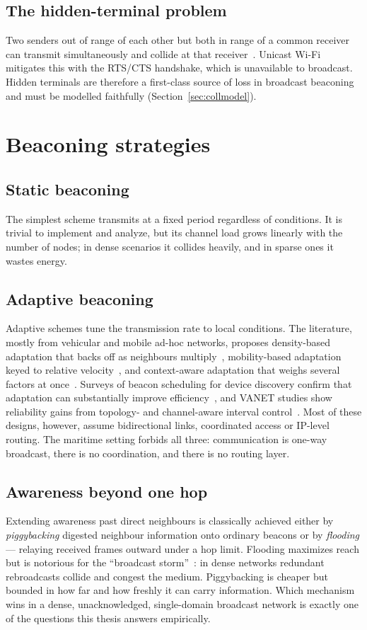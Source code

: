 \documentclass[12pt,a4paper,oneside]{report}
\begin{document}
\subsection{The hidden-terminal problem}
Two senders out of range of each other but both in range of a common receiver
can transmit simultaneously and collide at that receiver~\cite{tobagi-hidden}.
Unicast Wi-Fi mitigates this with the RTS/CTS handshake, which is unavailable to
broadcast. Hidden terminals are therefore a first-class source of loss in
broadcast beaconing and must be modelled faithfully (Section~\ref{sec:collmodel}).

\section{Beaconing strategies}
\subsection{Static beaconing}
The simplest scheme transmits at a fixed period regardless of conditions. It is
trivial to implement and analyze, but its channel load grows linearly with the
number of nodes; in dense scenarios it collides heavily, and in sparse ones it
wastes energy.

\subsection{Adaptive beaconing}
Adaptive schemes tune the transmission rate to local conditions. The literature,
mostly from vehicular and mobile ad-hoc networks, proposes density-based
adaptation that backs off as neighbours multiply~\cite{takai-dvcs}, mobility-based
adaptation keyed to relative velocity~\cite{alotaibi-adaptive}, and context-aware
adaptation that weighs several factors at once~\cite{sommer-adaptive}. Surveys of
beacon scheduling for device discovery confirm that adaptation can substantially
improve efficiency~\cite{chen-survey}, and VANET studies show reliability gains
from topology- and channel-aware interval control~\cite{zhao-vanet}. Most of
these designs, however, assume bidirectional links, coordinated access or IP-level
routing. The maritime setting forbids all three: communication is one-way
broadcast, there is no coordination, and there is no routing layer.

\subsection{Awareness beyond one hop}
Extending awareness past direct neighbours is classically achieved either by
\emph{piggybacking} digested neighbour information onto ordinary beacons or by
\emph{flooding} --- relaying received frames outward under a hop limit. Flooding
maximizes reach but is notorious for the ``broadcast storm''~\cite{broadcaststorm}:
in dense networks redundant rebroadcasts collide and congest the medium.
Piggybacking is cheaper but bounded in how far and how freshly it can carry
information. Which mechanism wins in a dense, unacknowledged, single-domain
broadcast network is exactly one of the questions this thesis answers
empirically.
\end{document}
